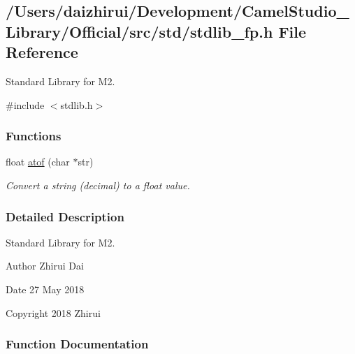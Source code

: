 \hypertarget{a00125}{}\subsection{/\+Users/daizhirui/\+Development/\+Camel\+Studio\+\_\+\+Library/\+Official/src/std/stdlib\+\_\+fp.h File Reference}
\label{a00125}


Standard Library for M2.  


{\ttfamily \#include $<$stdlib.\+h$>$}\newline
\subsubsection*{Functions}
\begin{DoxyCompactItemize}
\item 
float \mbox{\hyperlink{a00125_a40bb24dc7d4d98600cd976323cea17e0}{atof}} (char $\ast$str)
\begin{DoxyCompactList}\small\item\em Convert a string (decimal) to a float value. \end{DoxyCompactList}\end{DoxyCompactItemize}


\subsubsection{Detailed Description}
Standard Library for M2. 

\begin{DoxyAuthor}{Author}
Zhirui Dai 
\end{DoxyAuthor}
\begin{DoxyDate}{Date}
27 May 2018 
\end{DoxyDate}
\begin{DoxyCopyright}{Copyright}
2018 Zhirui 
\end{DoxyCopyright}


\subsubsection{Function Documentation}
\mbox{\label{a00125_a40bb24dc7d4d98600cd976323cea17e0}} 
